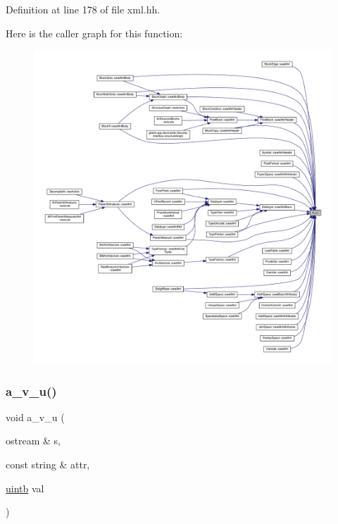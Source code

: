 Definition at line 178 of file xml.\+hh.

Here is the caller graph for this function\+:
\nopagebreak
\begin{figure}[H]
\begin{center}
\leavevmode
\includegraphics[width=350pt]{xml_8hh_aa12f4a381037faf4e90d1876bb44aa02_icgraph}
\end{center}
\end{figure}
\mbox{\label{xml_8hh_af098b9ed0ffa95b5f853eb3f88ec7064}} 
\subsubsection{\texorpdfstring{a\_v\_u()}{a\_v\_u()}}
{\footnotesize\ttfamily void a\+\_\+v\+\_\+u (\begin{DoxyParamCaption}\item[{ostream \&}]{s,  }\item[{const string \&}]{attr,  }\item[{\mbox{\hyperlink{types_8h_a2db313c5d32a12b01d26ac9b3bca178f}{uintb}}}]{val }\end{DoxyParamCaption})\hspace{0.3cm}{\ttfamily [inline]}}



